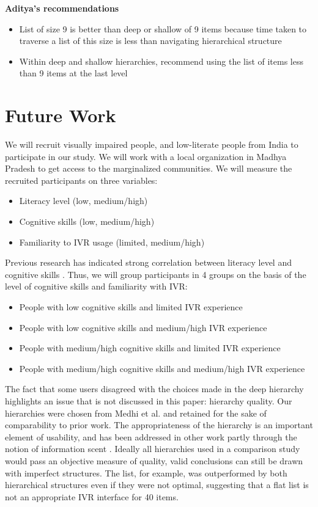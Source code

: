 \documentclass{sigchi}
\begin{document}
\textbf{Aditya's recommendations}
\begin{itemize}
\item List of size 9 is better than deep or shallow of 9 items because time taken to traverse a list of this size is less than navigating hierarchical structure
\item Within deep and shallow hierarchies, recommend using the list of items less than 9 items at the last level 
\end{itemize}



\section{Future Work}
We will recruit visually impaired people, and low-literate people from India to participate in our study. We will work with a local organization in Madhya Pradesh to get access to the marginalized communities. We will measure the recruited participants on three variables:
\begin{itemize}
\item Literacy level (low, medium/high)
\item Cognitive skills (low, medium/high)
\item Familiarity to IVR usage (limited, medium/high)
\end{itemize}

Previous research has indicated strong correlation between literacy level and cognitive skills \cite{Reis2001,Medhi2013a}. Thus, we will group participants in 4 groups on the basis of the level of cognitive skills and familiarity with IVR:

\begin{itemize}
\item People with low cognitive skills and limited IVR experience
\item People with low cognitive skills and medium/high IVR experience
\item People with medium/high cognitive skills and limited IVR experience
\item People with medium/high cognitive skills and medium/high IVR experience
\end{itemize}

The fact that some users disagreed with the choices made in the deep hierarchy highlights an issue that is not discussed in this paper: hierarchy quality. Our hierarchies were chosen from Medhi et al. and retained for the sake of comparability to prior work. The appropriateness of the hierarchy is an important element of usability, and has been addressed in other work partly through the notion of information scent \cite{Pirolli2000}. Ideally all hierarchies used in a comparison study would pass an objective measure of quality, valid conclusions can still be drawn with imperfect structures. The list, for example, was outperformed by both hierarchical structures even if they were not optimal, suggesting that a flat list is not an appropriate IVR interface for 40 items.
\end{document}
